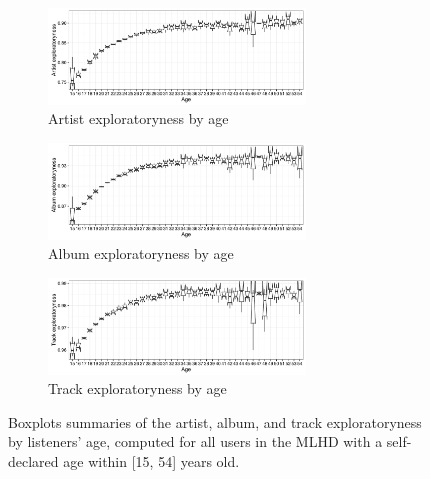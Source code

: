 \begin{figure}[!t]
	\centering
	\begin{subfigure}[b]{\textwidth}
		\centering
		\includegraphics[width=0.75\textwidth]{artist_exploratoryness.pdf}
        \caption{Artist exploratoryness by age}
        \label{fig:artist_exploratoryness}
	\end{subfigure}

	\begin{subfigure}[b]{\textwidth}
		\centering
		\includegraphics[width=0.75\textwidth]{album_exploratoryness.pdf}
        \caption{Album exploratoryness by age}
        \label{fig:album_exploratoryness}
	\end{subfigure}

	\begin{subfigure}[b]{\textwidth}
		\centering
		\includegraphics[width=0.75\textwidth]{track_exploratoryness.pdf}
        \caption{Track exploratoryness by age}
        \label{fig:track_exploratoryness}
	\end{subfigure}

\caption[Summary of computed artist, album, and track exploratoryness]{Boxplots summaries of the artist, album, and track exploratoryness by listeners' age, computed for all users in the MLHD with a self-declared age within [15, 54] years old.}
\label{fig:exploratoryness_by_age}
\end{figure}



